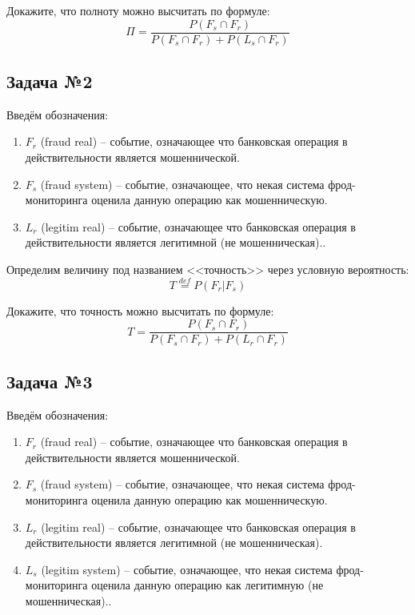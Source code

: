 \documentclass[english,russian,12pt]{article}
\begin{document}
Докажите, что полноту можно высчитать по формуле:
\begin{equation}
\Pi = \frac{P(F_s \cap F_r)}{P(F_s \cap F_r) + P(L_s \cap F_r)}
\end{equation}


\subsection*{Задача №2}
Введём обозначения:
\begin{enumerate}
	\item $F_r$ (fraud real) -- событие, означающее что банковская операция в действительности является мошеннической. 
	\item $F_s$ (fraud system) -- событие, означающее, что некая система фрод-мониторинга оценила данную операцию как мошенническую.
	\item $L_r$ (legitim real) -- событие, означающее что банковская операция в действительности является легитимной (не мошенническая).. 
\end{enumerate}

Определим величину под названием <<точность>> через условную вероятность:
\begin{equation}
T \stackrel{def}{=} P(F_r | F_s)
\end{equation}

Докажите, что точность можно высчитать по формуле:
\begin{equation}
T = \frac{P(F_s \cap F_r)}{P(F_s \cap F_r) + P(L_r \cap F_r)}
\end{equation}


\subsection*{Задача №3}
Введём обозначения:
\begin{enumerate}
	\item $F_r$ (fraud real) -- событие, означающее что банковская операция в действительности является мошеннической. 
	\item $F_s$ (fraud system) -- событие, означающее, что некая система фрод-мониторинга оценила данную операцию как мошенническую.
	\item $L_r$ (legitim real) -- событие, означающее что банковская операция в действительности является легитимной (не мошенническая).
 	\item $L_s$ (legitim system) -- событие, означающее, что некая система фрод-мониторинга оценила данную операцию как легитимную (не мошенническая).. 
\end{enumerate}
\end{document}
